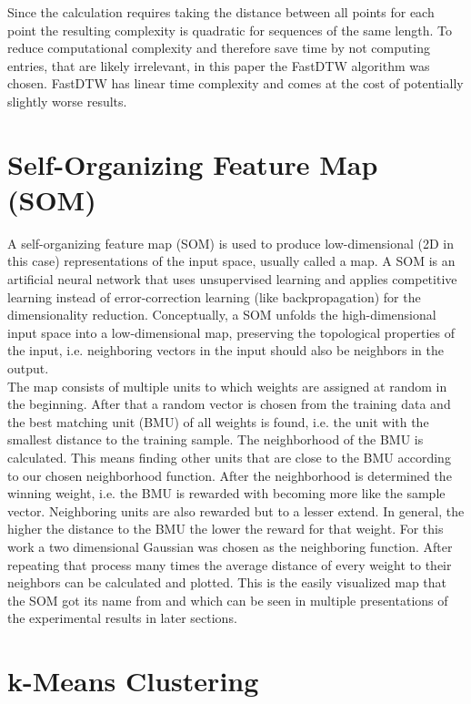 Since the calculation requires taking the distance between all points for each point the resulting complexity is quadratic for sequences of the same length. To reduce computational complexity and therefore save time by not computing entries, that are likely irrelevant, in this paper the FastDTW algorithm was chosen. FastDTW has linear time complexity and comes at the cost of potentially slightly worse results. 

\section{Self-Organizing Feature Map (SOM)}
\label{section:SOM}

A self-organizing feature map (SOM) is used to produce low-dimensional (2D in this case) representations of the input space, usually called a map. A SOM is an artificial neural network that uses unsupervised learning and applies competitive learning instead of error-correction learning (like backpropagation) for the dimensionality reduction. Conceptually, a SOM unfolds the high-dimensional input space into a low-dimensional map, preserving the topological properties of the input, i.e. neighboring vectors in the input should also be neighbors in the output. \\ 
The map consists of multiple units to which weights are assigned at random in the beginning. After that a random vector is chosen from the training data and the best matching unit (BMU) of all weights is found, i.e. the unit with the smallest distance to the training sample. The neighborhood of the BMU is calculated. This means finding other units that are close to the BMU according to our chosen neighborhood function. After the neighborhood is determined the winning weight, i.e. the BMU is rewarded with becoming more like the sample vector. Neighboring units are also rewarded but to a lesser extend. In general, the higher the distance to the BMU the lower the reward for that weight. For this work a two dimensional Gaussian was chosen as the neighboring function. After repeating that process many times the average distance of every weight to their neighbors can be calculated and plotted. This is the easily visualized map that the SOM got its name from and which can be seen in multiple presentations of the experimental results in later sections. 

\section{k-Means Clustering}
\label{section:k-means_clustering}

